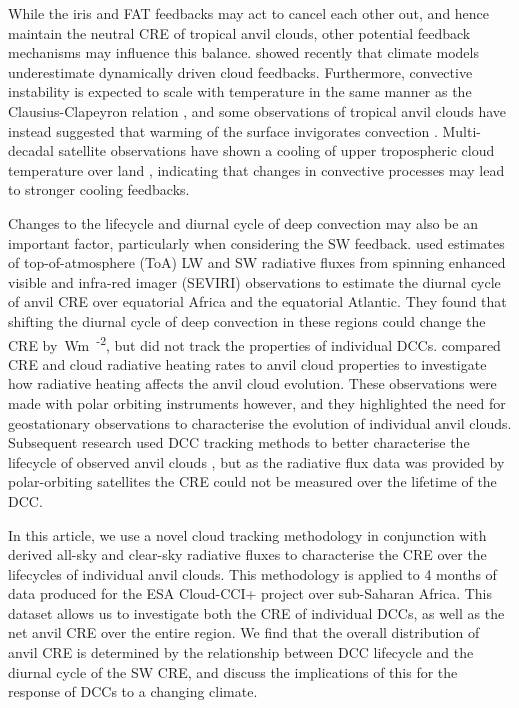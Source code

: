 \documentclass[acp, manuscript]{copernicus}
\begin{document}
While the iris and FAT feedbacks may act to cancel each other out, and hence maintain the neutral CRE of tropical anvil clouds, other potential feedback mechanisms may influence this balance.
\citet{hill_climate_2023} showed recently that climate models underestimate dynamically driven cloud feedbacks.
Furthermore, convective instability is expected to scale with temperature in the same manner as the Clausius-Clapeyron relation \citep{seeley_why_2015, agard_clausius_2017}, and some observations of tropical anvil clouds have instead suggested that warming of the surface invigorates convection \citep{igel_cloudsat_2014}.
Multi-decadal satellite observations have shown a cooling of upper tropospheric cloud temperature over land \citep{liu_observed_2023}, indicating that changes in convective processes may lead to stronger cooling feedbacks.

Changes to the lifecycle and diurnal cycle of deep convection may also be an important factor, particularly when considering the SW feedback. 
\citet{nowicki_observations_2004} used estimates of top-of-atmosphere (ToA) LW and SW radiative fluxes from spinning enhanced visible and infra-red imager (SEVIRI) observations to estimate the diurnal cycle of anvil CRE over equatorial Africa and the equatorial Atlantic. 
They found that shifting the diurnal cycle of deep convection in these regions could change the CRE by \,\unit{Wm\textsuperscript{-2}}, but did not track the properties of individual DCCs.
\citet{bouniol_macrophysical_2016} compared CRE and cloud radiative heating rates to anvil cloud properties to investigate how radiative heating affects the anvil cloud evolution.
These observations were made with polar orbiting instruments however, and they highlighted the need for geostationary observations to characterise the evolution of individual anvil clouds.
Subsequent research used DCC tracking methods to better characterise the lifecycle of observed anvil clouds \citep{bouniol_life_2021}, but as the radiative flux data was provided by polar-orbiting satellites the CRE could not be measured over the lifetime of the DCC.

In this article, we use a novel cloud tracking methodology in conjunction with derived all-sky and clear-sky radiative fluxes to characterise the CRE over the lifecycles of individual anvil clouds. 
This methodology is applied to 4 months of data produced for the ESA Cloud-CCI+ project over sub-Saharan Africa. 
This dataset allows us to investigate both the CRE of individual DCCs, as well as the net anvil CRE over the entire region. 
We find that the overall distribution of anvil CRE is determined by the relationship between DCC lifecycle and the diurnal cycle of the SW CRE, and discuss the implications of this for the response of DCCs to a changing climate.
\end{document}
